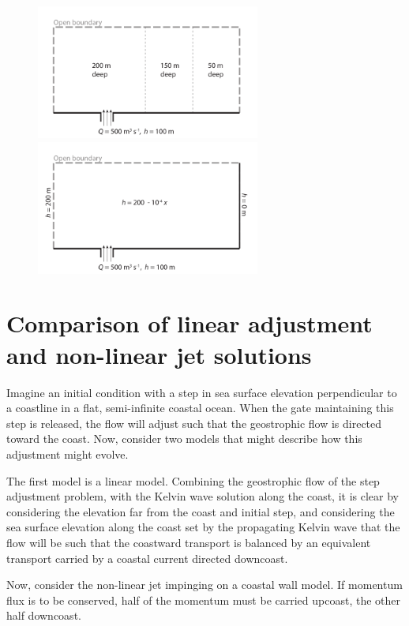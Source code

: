 \documentclass[11pt]{report}
\numberwithin{equation}{section}
\begin{document}
\begin{figure}[h]
  \centering
    \includegraphics[width=2.9in]{ideal1.pdf}\hfill
    \includegraphics[width=2.9in]{ideal2.pdf}
  \label{fig:ideal}
\end{figure}

\clearpage
\section{Comparison of linear adjustment and non-linear jet solutions}
\label{prob:step_wall_adjustment}

Imagine an initial condition with a step in sea surface elevation perpendicular to a coastline in a flat, semi-infinite coastal ocean.  When the gate maintaining this step is released, the flow will adjust such that the geostrophic flow is directed toward the coast.  Now, consider two models that might describe how this adjustment might evolve.

The first model is a linear model.  Combining the geostrophic flow of the step adjustment problem, with the Kelvin wave solution along the coast, it is clear by considering the elevation far from the coast and initial step, and considering the sea surface elevation along the coast set by the propagating Kelvin wave that the flow will be such that the coastward transport is balanced by an equivalent transport carried by a coastal current directed downcoast.

Now, consider the non-linear jet impinging on a coastal wall model.  If momentum flux is to be conserved, half of the momentum must be carried upcoast, the other half downcoast.
\end{document}
